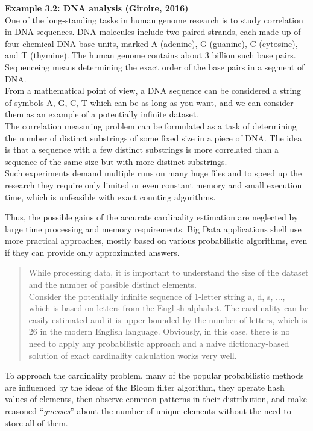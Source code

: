 \documentclass[a4paper,13pt]{article}
\theoremstyle{mytheor}
\begin{document}
\begin{mdframed}
    \textbf{Example 3.2: DNA analysis (Giroire, 2016)}\\
    One of the long-standing tasks in human genome research is to study
    correlation in DNA sequences. DNA molecules include two paired strands,
    each made up of four chemical DNA-base units, marked A (adenine),
    G (guanine), C (cytosine), and T (thymine). The human genome contains
    about 3 billion such base pairs. Sequenceing means determining the exact
    order of the base pairs in a segment of DNA.\\
    From a mathematical point of view, a DNA sequence can be considered
    a string of symbols A, G, C, T which can be as long as you want, and we
    can consider them as an example of a potentially infinite dataset.\\
    The correlation measuring problem can be formulated as a task of
    determining the number of distinct substrings of some fixed size in a piece
    of DNA. The idea is that a sequence with a few distinct substrings is 
    more correlated than a sequence of the same size but with more distinct
    substrings.\\
    Such experiments demand multiple runs on many huge files and to speed
    up the research they require only limited or even constant memory and
    small execution time, which is unfeasible with exact counting algorithms.
\end{mdframed}
Thus, the possible gains of the accurate cardinality estimation are
neglected by large time processing and memory requirements. Big Data
applications shell use more practical approaches, mostly based on various
probabilistic algorithms, even if they can provide only approzimated answers.\\
\vspace{0.5cm}
\begin{quote}
    While processing data, it is important to understand the size of the dataset
    and the number of possible distinct elements.\\
    Consider the potentially infinite sequence of 1-letter string a, d, s, ...,
    which is based on letters from the English alphabet. The cardinality can be
    easily estimated and it is upper bounded by the number of letters, which
    is 26 in the modern English language. Obviously, in this case, there is
    no need to apply any probabilistic approach and a naive dictionary-based
    solution of exact cardinality calculation works very well.\\
\end{quote}
\indent To approach the cardinality problem, many of the popular probabilistic
methods are influenced by the ideas of the Bloom filter algorithm, they
operate hash values of elements, then observe common patterns in their
distribution, and make reasoned \textquotedblleft\textit{guesses}\textquotedblright 
\space about the number of unique elements without the need to store all of them.
\end{document}
